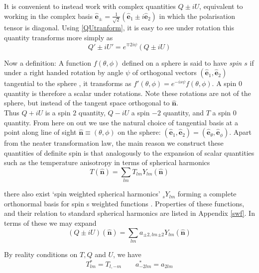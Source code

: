 \documentclass[a4paper,10pt]{article}
\renewcommand{\v}[1]{\mathbf{#1}}
\newcommand{\unit}[1]{\hat{\v{#1}}}
\begin{document}
It is convenient to instead work with complex quantities $Q\pm iU$, equivalent to working in the complex basis $\unit{e}_\pm = \frac{1}{\sqrt{2}}(\unit{e}_1 \pm i\unit{e}_2)$ in which the polarisation tensor is diagonal. Using \ref{QUtranform}, it is easy to see under rotation this quantity transforms more simply as
\begin{equation}
Q'\pm iU' = e^{\mp 2i\psi}(Q\pm iU)
\end{equation}

Now a definition: A function $f(\theta, \phi)$ defined on a sphere is said to have \textit{spin $s$} if under a right handed rotation by angle $\psi$ of orthogonal vectors $(\unit{e}_1, \unit{e}_2)$ tangential to the sphere , it transforms as $f'(\theta, \phi) = e^{-is\psi}f(\theta, \phi)$. A spin 0 quantity is therefore a scalar under rotations. Note these rotations are not of the sphere, but instead of the tangent space orthogonal to $\unit{n}$.\\

Thus $Q+iU$ is a spin $2$ quantity, $Q-iU$ a spin $-2$ quantity, and $T$ a spin $0$ quantity. From here on out we use the natural choice of tangential basis at a point along line of sight $\unit{n} \equiv (\theta, \phi)$ on the sphere: $(\unit{e}_1, \unit{e}_2) = (\unit{e}_\theta, \unit{e}_\phi)$. Apart from the neater transformation law, the main reason we construct these quantities of definite spin is that analogously to the expansion of scalar quantities such as the temperature anisotropy in terms of spherical harmonics
\begin{equation}
T(\unit{n}) = \sum_{lm} T_{lm}Y_{lm}(\unit{n})
\end{equation}

there also exist `spin weighted spherical harmonics' $_sY_{lm}$ forming a complete orthonormal basis for spin s weighted functions \cite{all-sky}. Properties of these functions, and their relation to standard spherical harmonics are listed in Appendix \ref{swf}. In terms of these we may expand
\begin{equation}
(Q\pm iU)(\unit{n}) = \sum_{lm} a_{\pm2,lm} {}_{\pm2}Y_{lm}(\unit{n})
\label{QUexp}
\end{equation}

By reality conditions on $T, Q$ and $U$, we have
\begin{equation}
T_{lm}^* = T_{l,-m} \qquad a_{-2lm}^*=a_{2lm}
\end{equation}
\end{document}
